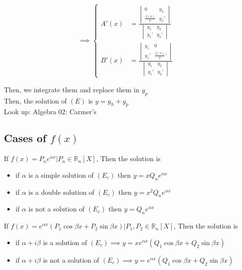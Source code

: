 \documentclass{article}
\begin{document}
\[
    \implies 
    \begin{cases}
        A'(x) &= \frac{
            \begin{vmatrix}
                0 & y_{2}\\
                \frac{f(x)}{a} & y_{2}' 
            \end{vmatrix}}{
            \begin{vmatrix}
                y_{1} & y_{2}\\
                y_{1}' & y_{2}' 
            \end{vmatrix}}\\
        B'(x) &= \frac{
            \begin{vmatrix}
                y_{1} & 0\\
                y_{1}'  & \frac{f(x)}{a}'
            \end{vmatrix}}{
            \begin{vmatrix}
                y_{1} & y_{2}\\
                y_{1}' & y_{2}' 
            \end{vmatrix}}
    \end{cases}
\]

Then,  we integrate them and replace them in $y_{p}$ \\
Then, the solution of $(E)$ is $y = y_{h}+y_{p}$ \\
Look up: Algebra 02: Carmer's \\

\subsection{Cases of $f(x)$}

If $f(x) = P_{n}e^{\alpha x} | P_{n} \in \mathbb{R}_{n}[X]$, Then the solution is


\begin{itemize}
    \item if $\alpha$ is a simple solution of $(E_{c})$ then $y = xQ_{n}e^{\alpha x}$ \\
    \item if $\alpha$ is a double solution of $(E_{c})$ then $y = x^2Q_{n}e^{\alpha x}$ \\
    \item if $\alpha$ is not a solution of $(E_{c})$ then $y = Q_{n}e^{\alpha x}$
\end{itemize}

If $f(x) = e^{\alpha x} (P_{1}\cos{\beta x}+P_{2}\sin{\beta x}) | P_{1}, P_{2} \in \mathbb{R}_{n}[X]$, Then the solution is 
\begin{itemize}
    \item if $\alpha +i\beta$ is a solution of $(E_{c}) \implies y = xe^{\alpha x} (Q_{1}\cos{\beta x}+Q_{2}\sin{\beta x})$ \\
    \item if $\alpha+i\beta$ is not a solution of $(E_{c}) \implies y = e^{\alpha x} (Q_{1}\cos{\beta x}+Q_{2}\sin{\beta x})$ \\
\end{itemize}
\end{document}

